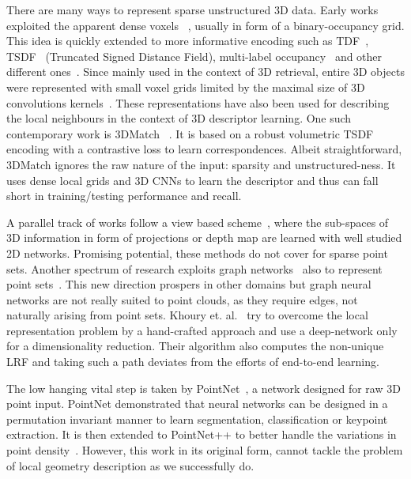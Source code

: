 \documentclass[10pt,twocolumn,letterpaper]{article}
\theoremstyle{break}
\begin{document}
There are many ways to represent sparse unstructured 3D data. Early works exploited the apparent dense voxels ~\cite{maturana2015voxnet,qi2016volumetric}, usually in form of a binary-occupancy grid. This idea is quickly extended to more informative encoding such as TDF~\cite{song2016deep}, TSDF~\cite{zeng20163dmatch} (Truncated Signed Distance Field), multi-label occupancy~\cite{wu20153d} and other different ones~\cite{huang2016point,yarotsky2017geometric}. Since mainly used in the context of 3D retrieval, entire 3D objects were represented with small voxel grids  limited by the maximal size of 3D convolutions kernels~\cite{maturana2015voxnet}. These representations have also been used for describing the local neighbours in the context of 3D descriptor learning. One such contemporary work is 3DMatch ~\cite{zeng20163dmatch}. It is based on a robust volumetric TSDF encoding with a contrastive loss to learn correspondences. Albeit straightforward, 3DMatch ignores the raw nature of the input: sparsity and unstructured-ness. It uses dense local grids and 3D CNNs to learn the descriptor and thus can fall short in training/testing performance and recall. 

A parallel track of works follow a view based scheme~\cite{Elbaz_2017_CVPR,huangKCCKY17}, where the sub-spaces of 3D information in form of projections or depth map are learned with well studied 2D networks. Promising potential, these methods do not cover for sparse point sets. Another spectrum of research exploits graph networks~\cite{kipf2016semi,defferrard2016convolutional} also to represent point sets~\cite{Qi_2017_ICCV}. This new direction prospers in other domains but graph neural networks are not really suited to point clouds, as they require edges, not naturally arising from point sets. Khoury et. al.~\cite{Khoury_2017_ICCV} try to overcome the local representation problem by a hand-crafted approach and use a deep-network only for a dimensionality reduction. Their algorithm also computes the non-unique LRF and taking such a path deviates from the efforts of end-to-end learning.

The low hanging vital step is taken by PointNet~\cite{qi2016pointnet}, a network designed for raw 3D point input. PointNet demonstrated that neural networks can be designed in a permutation invariant manner to learn segmentation, classification or keypoint extraction. It is then extended to PointNet++ to better handle the variations in point density~\cite{qi2017pointnet++}. However, this work in its original form, cannot tackle the problem of local geometry description as we successfully do.
\end{document}
